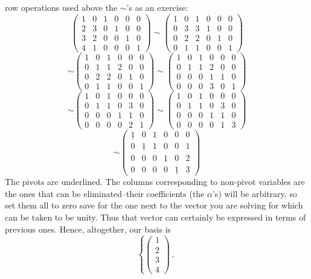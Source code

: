 {row operations used above the $\sim$'s as an exercise:
\[
\begin{pmatrix}
1&0&1&0&0&0\\
2&3&0&1&0&0\\
3&2&0&0&1&0\\
4&1&0&0&0&1
\end{pmatrix}\sim
\begin{pmatrix}
1&0&1&0&0&0\\
0&3&3&1&0&0\\
0&2&2&0&1&0\\
0&1&1&0&0&1
\end{pmatrix}
\]
\[
\sim
\begin{pmatrix}
1&0&1&0&0&0\\
0&1&1&2&0&0\\
0&2&2&0&1&0\\
0&1&1&0&0&1
\end{pmatrix}
\sim
\begin{pmatrix}
1&0&1&0&0&0\\
0&1&1&2&0&0\\
0&0&0&1&1&0\\
0&0&0&3&0&1
\end{pmatrix}
\]
\[
\sim
\begin{pmatrix}
1&0&1&0&0&0\\
0&1&1&0&3&0\\
0&0&0&1&1&0\\
0&0&0&0&2&1
\end{pmatrix}
\sim
\begin{pmatrix}
1&0&1&0&0&0\\
0&1&1&0&3&0\\
0&0&0&1&1&0\\
0&0&0&0&1&3
\end{pmatrix}
\]
\[
\sim
\begin{pmatrix}
\underline1&0&1&0&0&0\\
0&\underline1&1&0&0&1\\
0&0&0&\underline1&0&2\\
0&0&0&0&\underline1&3
\end{pmatrix}
\]
The pivots are underlined.
The columns corresponding to non-pivot variables are the ones that can be eliminated--their coefficients (the $\alpha$'s)
will be arbitrary, so set them all to zero save for the one next to the vector you are solving for which can be taken to be unity.
Thus that vector can certainly be expressed in terms of previous ones. Hence, altogether, our basis is
\[
\left\{
\begin{pmatrix}1\\2\\3\\4\end{pmatrix} \, , \ 
\]}
